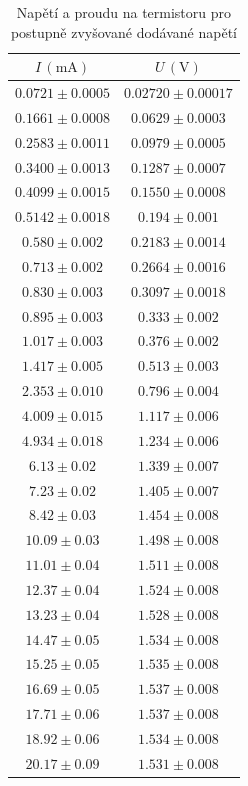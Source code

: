 \documentclass{../concepts/prepareprotokol} %
\begin{document}
\begin{table}[hbtp]
\centering
\caption{Napětí a proudu na termistoru pro postupně zvyšované dodávané napětí}
\begin{tabular}{cc}
 \toprule
 $I\, (\mathrm{mA})$ & $U\, (\mathrm{V})$ \\
 \midrule
 $0.0721 \pm 0.0005$ & $0.02720 \pm 0.00017$ \\
 $0.1661 \pm 0.0008$ & $0.0629 \pm 0.0003$ \\
 $0.2583 \pm 0.0011$ & $0.0979 \pm 0.0005$ \\
 $0.3400 \pm 0.0013$ & $0.1287 \pm 0.0007$ \\
 $0.4099 \pm 0.0015$ & $0.1550 \pm 0.0008$ \\
 $0.5142 \pm 0.0018$ & $0.194 \pm 0.001$ \\
 $0.580 \pm 0.002$ & $0.2183 \pm 0.0014$ \\
 $0.713 \pm 0.002$ & $0.2664 \pm 0.0016$ \\
 $0.830 \pm 0.003$ & $0.3097 \pm 0.0018$ \\
 $0.895 \pm 0.003$ & $0.333 \pm 0.002$ \\
 $1.017 \pm 0.003$ & $0.376 \pm 0.002$ \\
 $1.417 \pm 0.005$ & $0.513 \pm 0.003$ \\
 $2.353 \pm 0.010$ & $0.796 \pm 0.004$ \\
 $4.009 \pm 0.015$ & $1.117 \pm 0.006$ \\
 $4.934 \pm 0.018$ & $1.234 \pm 0.006$ \\
 $6.13 \pm 0.02$ & $1.339 \pm 0.007$ \\
 $7.23 \pm 0.02$ & $1.405 \pm 0.007$ \\
 $8.42 \pm 0.03$ & $1.454 \pm 0.008$ \\
 $10.09 \pm 0.03$ & $1.498 \pm 0.008$ \\
 $11.01 \pm 0.04$ & $1.511 \pm 0.008$ \\
 $12.37 \pm 0.04$ & $1.524 \pm 0.008$ \\
 $13.23 \pm 0.04$ & $1.528 \pm 0.008$ \\
 $14.47 \pm 0.05$ & $1.534 \pm 0.008$ \\
 $15.25 \pm 0.05$ & $1.535 \pm 0.008$ \\
 $16.69 \pm 0.05$ & $1.537 \pm 0.008$ \\
 $17.71 \pm 0.06$ & $1.537 \pm 0.008$ \\
 $18.92 \pm 0.06$ & $1.534 \pm 0.008$ \\
 $20.17 \pm 0.09$ & $1.531 \pm 0.008$ \\

\end{tabular}
\end{table}
\end{document}
